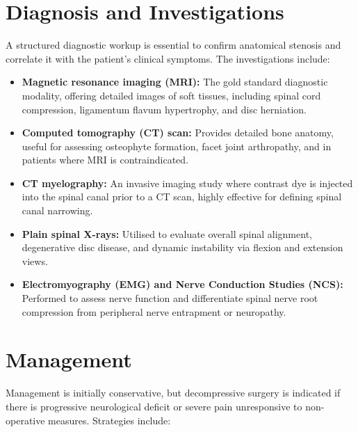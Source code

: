 \section*{Diagnosis and Investigations}
A structured diagnostic workup is essential to confirm anatomical stenosis and correlate it with the patient's clinical symptoms. The investigations include:

\begin{itemize}
    \item \textbf{Magnetic resonance imaging (MRI):} The gold standard diagnostic modality, offering detailed images of soft tissues, including spinal cord compression, ligamentum flavum hypertrophy, and disc herniation.
    \item \textbf{Computed tomography (CT) scan:} Provides detailed bone anatomy, useful for assessing osteophyte formation, facet joint arthropathy, and in patients where MRI is contraindicated.
    \item \textbf{CT myelography:} An invasive imaging study where contrast dye is injected into the spinal canal prior to a CT scan, highly effective for defining spinal canal narrowing.
    \item \textbf{Plain spinal X-rays:} Utilised to evaluate overall spinal alignment, degenerative disc disease, and dynamic instability via flexion and extension views.
    \item \textbf{Electromyography (EMG) and Nerve Conduction Studies (NCS):} Performed to assess nerve function and differentiate spinal nerve root compression from peripheral nerve entrapment or neuropathy.
\end{itemize}

\section*{Management}
Management is initially conservative, but decompressive surgery is indicated if there is progressive neurological deficit or severe pain unresponsive to non-operative measures. Strategies include:


